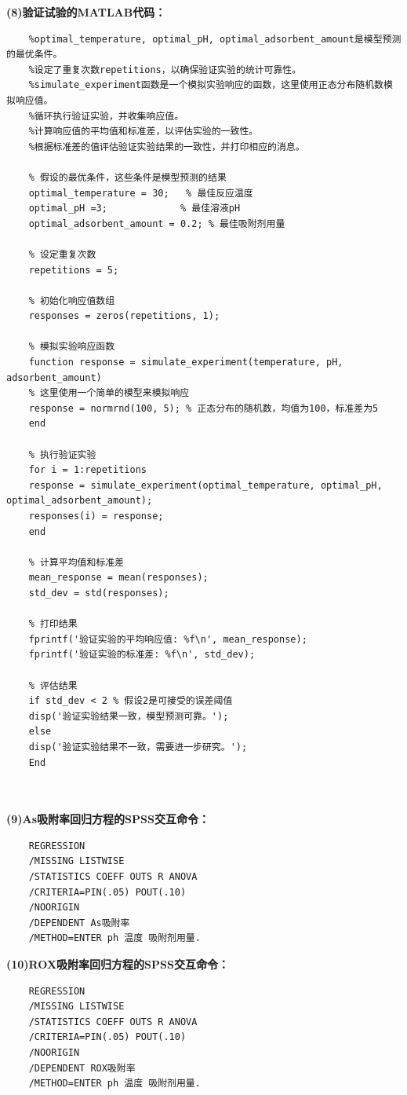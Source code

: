 \documentclass[AutoFakeBold]{ctexart}
\begin{document}
 \centering\textbf{(8)验证试验的MATLAB代码：}
 \lstset{language=MATLAB}
 \lstset{breaklines}%
 \begin{lstlisting}
 	%optimal_temperature, optimal_pH, optimal_adsorbent_amount是模型预测的最优条件。
 	%设定了重复次数repetitions，以确保验证实验的统计可靠性。
 	%simulate_experiment函数是一个模拟实验响应的函数，这里使用正态分布随机数模拟响应值。
 	%循环执行验证实验，并收集响应值。
 	%计算响应值的平均值和标准差，以评估实验的一致性。
 	%根据标准差的值评估验证实验结果的一致性，并打印相应的消息。
 	
 	% 假设的最优条件，这些条件是模型预测的结果
 	optimal_temperature = 30;   % 最佳反应温度
 	optimal_pH =3;             % 最佳溶液pH
 	optimal_adsorbent_amount = 0.2; % 最佳吸附剂用量
 	
 	% 设定重复次数
 	repetitions = 5;
 	
 	% 初始化响应值数组
 	responses = zeros(repetitions, 1);
 	
 	% 模拟实验响应函数
 	function response = simulate_experiment(temperature, pH, adsorbent_amount)
 	% 这里使用一个简单的模型来模拟响应
 	response = normrnd(100, 5); % 正态分布的随机数，均值为100，标准差为5
 	end
 	
 	% 执行验证实验
 	for i = 1:repetitions
 	response = simulate_experiment(optimal_temperature, optimal_pH, optimal_adsorbent_amount);
 	responses(i) = response;
 	end
 	
 	% 计算平均值和标准差
 	mean_response = mean(responses);
 	std_dev = std(responses);
 	
 	% 打印结果
 	fprintf('验证实验的平均响应值: %f\n', mean_response);
 	fprintf('验证实验的标准差: %f\n', std_dev);
 	
 	% 评估结果
 	if std_dev < 2 % 假设2是可接受的误差阈值
 	disp('验证实验结果一致，模型预测可靠。');
 	else
 	disp('验证实验结果不一致，需要进一步研究。');
 	End
 	
 	
 \end{lstlisting}
 \newpage
 \centering\textbf{(9)As吸附率回归方程的SPSS交互命令：}
 \begin{verbatim}
 	REGRESSION
 	/MISSING LISTWISE
 	/STATISTICS COEFF OUTS R ANOVA
 	/CRITERIA=PIN(.05) POUT(.10)
 	/NOORIGIN
 	/DEPENDENT As吸附率
 	/METHOD=ENTER ph 温度 吸附剂用量.
 \end{verbatim}
 
 
 \centering\textbf{(10)ROX吸附率回归方程的SPSS交互命令：}
 \begin{verbatim}
 	REGRESSION
 	/MISSING LISTWISE
 	/STATISTICS COEFF OUTS R ANOVA
 	/CRITERIA=PIN(.05) POUT(.10)
 	/NOORIGIN
 	/DEPENDENT ROX吸附率
 	/METHOD=ENTER ph 温度 吸附剂用量.
 \end{verbatim}
\end{document}
